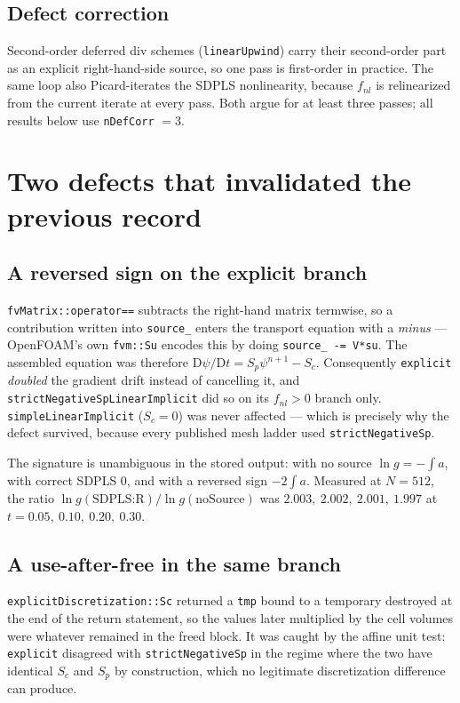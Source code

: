 \documentclass[preprint,3p,11pt]{elsarticle}
\newcommand{\psilev}{\psi}
\begin{document}
\subsection{Defect correction}
Second-order deferred div schemes (\texttt{linearUpwind}) carry their
second-order part as an explicit right-hand-side source, so one pass is
first-order in practice. The same loop also Picard-iterates the SDPLS
nonlinearity, because $f_{nl}$ is relinearized from the current iterate at
every pass. Both argue for at least three passes; all results below use
\texttt{nDefCorr} $=3$.

\section{Two defects that invalidated the previous record}
\label{sec:defects}

\subsection{A reversed sign on the explicit branch}
\texttt{fvMatrix::operator==} subtracts the right-hand matrix termwise, so a
contribution written into \texttt{source\_} enters the transport equation with
a \emph{minus} --- OpenFOAM's own \texttt{fvm::Su} encodes this by doing
\texttt{source\_ -= V*su}. The assembled equation was therefore
$\mathrm D\psilev/\mathrm Dt = S_p\psilev^{n+1} - S_c$. Consequently
\texttt{explicit} \emph{doubled} the gradient drift instead of cancelling it,
and \texttt{strictNegativeSpLinearImplicit} did so on its $f_{nl}>0$ branch
only. \texttt{simpleLinearImplicit} ($S_c=0$) was never affected --- which is
precisely why the defect survived, because every published mesh ladder used
\texttt{strictNegativeSp}.

The signature is unambiguous in the stored output: with no source
$\ln g = -\!\int\! a$, with correct SDPLS $0$, and with a reversed sign
$-2\!\int\! a$. Measured at $N=512$, the ratio
$\ln g(\text{SDPLS:R})/\ln g(\text{noSource})$ was
$2.003,\ 2.002,\ 2.001,\ 1.997$ at $t = 0.05,\ 0.10,\ 0.20,\ 0.30$.

\subsection{A use-after-free in the same branch}
\texttt{explicitDiscretization::Sc} returned a \texttt{tmp} bound to a
temporary destroyed at the end of the return statement, so the values later
multiplied by the cell volumes were whatever remained in the freed block. It
was caught by the affine unit test: \texttt{explicit} disagreed with
\texttt{strictNegativeSp} in the regime where the two have identical $S_c$ and
$S_p$ by construction, which no legitimate discretization difference can
produce.
\end{document}

